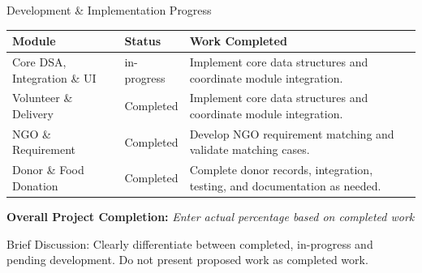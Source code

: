 \documentclass[aspectratio=169,11pt]{beamer}
\newcommand{\smallnote}[1]{%
\vspace{0.08cm}
{\scriptsize\color{GEUGrey}#1}
}
\newcommand{\placeholder}[1]{%
\textit{\color{GEUGrey}#1}
}
\begin{document}
\begin{frame}{Development \& Implementation Progress}

\scriptsize

\begin{center}

\renewcommand{\arraystretch}{1.25}

\begin{tabularx}{.96\textwidth}
{@{}p{3cm}p{2.2cm}X@{}}

\toprule
\textbf{Module} &
\textbf{Status} &
\textbf{Work Completed}\\
\midrule

Core DSA, Integration \& UI &
in-progress &
Implement core data structures and coordinate module integration.\\

Volunteer \& Delivery &
Completed &
Implement core data structures and coordinate module integration.\\

NGO \& Requirement &
Completed&
Develop NGO requirement matching and validate matching cases.\\

Donor \& Food Donation &
Completed &
Complete donor records, integration, testing, and documentation as needed.\\

\bottomrule

\end{tabularx}

\end{center}

\vspace{3mm}

\begin{center}
\colorbox{GEULightBlue}{
\parbox{.65\textwidth}{
\centering
\textbf{Overall Project Completion:}
\placeholder{Enter actual percentage based on completed work}
}}
\end{center}

\vfill

\smallnote{
Brief Discussion: Clearly differentiate between completed,
in-progress and pending development. Do not present proposed work
as completed work.
}

\end{frame}
\end{document}
